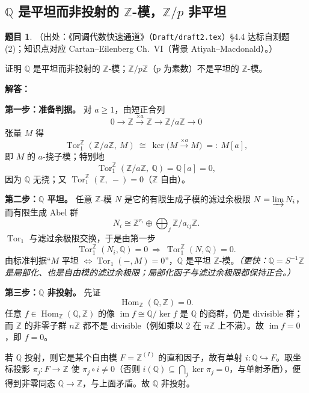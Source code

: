 \documentclass[a4paper]{ctexart}
\theoremstyle{definition}
\newtheorem{example}{题目}[section]
\theoremstyle{analysis}
\theoremstyle{plain}
\begin{document}
\subsection{\texorpdfstring{\(\mathbb Q\) 是平坦而非投射的 \(\mathbb Z\)-模，\(\mathbb Z/p\) 非平坦}{Q 是平坦而非投射的 Z-模，Z/p 非平坦}}\label{subsec:problem-q-flat-not-projective}

\begin{example}
（出处：《同调代数快速通道》（\texttt{Draft/draft2.tex}）\S4.4 达标自测题 (2)；知识点对应 Cartan--Eilenberg Ch.~VI（背景 Atiyah--Macdonald）。）

证明 \(\mathbb Q\) 是平坦而非投射的 \(\mathbb Z\)-模；\(\mathbb Z/p\mathbb Z\)（\(p\) 为素数）不是平坦的 \(\mathbb Z\)-模。

\textbf{解答：}

\textbf{第一步：准备判据。} 对 \(a\ge 1\)，由短正合列
\[
  0\longrightarrow \mathbb Z\xrightarrow{\times a}\mathbb Z\longrightarrow \mathbb Z/a\mathbb Z\longrightarrow 0
\]
张量 \(M\) 得
\[
  \operatorname{Tor}_1^{\mathbb Z}(\mathbb Z/a\mathbb Z,\ M)
  \ \cong\ \ker\bigl(M\xrightarrow{\times a}M\bigr)
  \ =:\ M[a],
\]
即 \(M\) 的 \(a\)-挠子模；特别地
\[
  \operatorname{Tor}_1^{\mathbb Z}(\mathbb Z/a\mathbb Z,\ \mathbb Q)=\mathbb Q[a]=0,
\]
因为 \(\mathbb Q\) 无挠；又 \(\operatorname{Tor}_1^{\mathbb Z}(\mathbb Z,\ -)=0\)（\(\mathbb Z\) 自由）。

\textbf{第二步：\(\mathbb Q\) 平坦。} 任意 \(\mathbb Z\)-模 \(N\) 是它的有限生成子模的滤过余极限 \(N=\varinjlim N_i\)，而有限生成 Abel 群
\[
  N_i\cong \mathbb Z^{r_i}\oplus \bigoplus_j \mathbb Z/a_{ij}\mathbb Z.
\]
\(\operatorname{Tor}_1\) 与滤过余极限交换，于是由第一步
\[
  \operatorname{Tor}_1^{\mathbb Z}(N_i,\mathbb Q)=0
  \ \Longrightarrow\ \operatorname{Tor}_1^{\mathbb Z}(N,\mathbb Q)=0.
\]
由标准判据“\(M\) 平坦 \(\iff\operatorname{Tor}_1(-,M)=0\)”，\(\mathbb Q\) 是平坦 \(\mathbb Z\)-模。\emph{（更快：\(\mathbb Q=S^{-1}\mathbb Z\) 是局部化、也是自由模的滤过余极限；局部化函子与滤过余极限都保持正合。）}

\textbf{第三步：\(\mathbb Q\) 非投射。} 先证
\[
  \operatorname{Hom}_{\mathbb Z}(\mathbb Q,\mathbb Z)=0.
\]
任意 \(f\in\operatorname{Hom}_{\mathbb Z}(\mathbb Q,\mathbb Z)\) 的像 \(\operatorname{im}f\cong\mathbb Q/\ker f\) 是 \(\mathbb Q\) 的商群，仍是 divisible 群；而 \(\mathbb Z\) 的非零子群 \(n\mathbb Z\) 都不是 divisible（例如乘以 \(2\) 在 \(n\mathbb Z\) 上不满）。故 \(\operatorname{im}f=0\)，即 \(f=0\)。

若 \(\mathbb Q\) 投射，则它是某个自由模 \(F=\mathbb Z^{(I)}\) 的直和因子，故有单射 \(i\colon\mathbb Q\hookrightarrow F\)。取坐标投影 \(\pi_j\colon F\to\mathbb Z\) 使 \(\pi_j\circ i\neq 0\)（否则 \(i(\mathbb Q)\subseteq\bigcap_j\ker\pi_j=0\)，与单射矛盾），便得到非零同态 \(\mathbb Q\to\mathbb Z\)，与上面矛盾。故 \(\mathbb Q\) 非投射。


\end{example}
\end{document}
